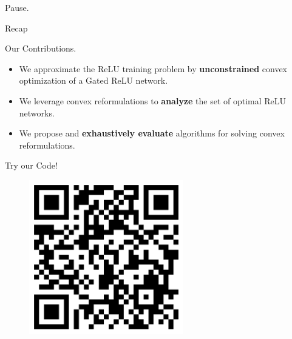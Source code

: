 \documentclass[usenames,dvipsnames,mathserif,notheorems]{beamer}
\begin{document}

\begin{frame}{}
	\begin{center}
		\huge Pause.
	\end{center}
\end{frame}

\begin{frame}{Recap}
	\begin{center}
		\huge   Our Contributions.
	\end{center}

	\vspace{2em}
	\pause
	{ \large
		\begin{itemize}
			\item We approximate the ReLU training problem by \textbf{unconstrained}
			      convex optimization of a Gated ReLU network.\pause
			      \vspace{0.5em}

			\item We leverage convex reformulations to \textbf{analyze} the set
			      of optimal ReLU networks.
			      \pause
			      \vspace{0.5em}

			\item We propose and \textbf{exhaustively evaluate} algorithms for solving
			      convex reformulations.
		\end{itemize}
	}

\end{frame}




\begin{frame}{}
	\begin{center}
		\huge Try our Code!
	\end{center}

	\begin{figure}[]
		\centering
		\includegraphics[width=0.6\textwidth]{assets/github.png}
	\end{figure}
\end{frame}
\end{document}
